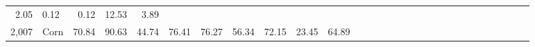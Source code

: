 \documentclass[]{article}
\begin{document}
\begin{longtable}[]{@{}rlrrrrrrrrrrrrrrrrrrrrrrrrrrr@{}}
\begin{minipage}[t]{0.02\columnwidth}
2.05\strut
\end{minipage} & \begin{minipage}[t]{0.01\columnwidth}\raggedleft\strut
0.12\strut
\end{minipage} & \begin{minipage}[t]{0.01\columnwidth}\raggedleft\strut
0.12\strut
\end{minipage} & \begin{minipage}[t]{0.01\columnwidth}\raggedleft\strut
12.53\strut
\end{minipage} & \begin{minipage}[t]{0.01\columnwidth}\raggedleft\strut
3.89\strut
\end{minipage}\tabularnewline
\begin{minipage}[t]{0.01\columnwidth}\raggedleft\strut
2,007\strut
\end{minipage} & \begin{minipage}[t]{0.02\columnwidth}\raggedright\strut
Corn\strut
\end{minipage} & \begin{minipage}[t]{0.01\columnwidth}\raggedleft\strut
70.84\strut
\end{minipage} & \begin{minipage}[t]{0.02\columnwidth}\raggedleft\strut
90.63\strut
\end{minipage} & \begin{minipage}[t]{0.02\columnwidth}\raggedleft\strut
44.74\strut
\end{minipage} & \begin{minipage}[t]{0.02\columnwidth}\raggedleft\strut
76.41\strut
\end{minipage} & \begin{minipage}[t]{0.01\columnwidth}\raggedleft\strut
76.27\strut
\end{minipage} & \begin{minipage}[t]{0.01\columnwidth}\raggedleft\strut
56.34\strut
\end{minipage} & \begin{minipage}[t]{0.01\columnwidth}\raggedleft\strut
72.15\strut
\end{minipage} & \begin{minipage}[t]{0.01\columnwidth}\raggedleft\strut
23.45\strut
\end{minipage} & \begin{minipage}[t]{0.01\columnwidth}\raggedleft\strut
64.89\strut
\end{minipage} & \begin{minipage}[t]{0.01\columnwidth}\raggedleft\strut

\end{minipage}
\end{longtable}
\end{document}
